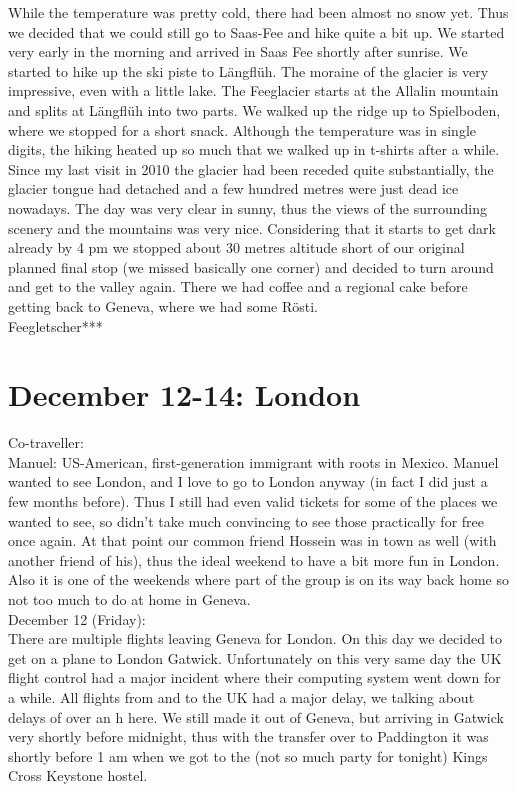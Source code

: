 While the temperature was pretty cold, there had been almost no snow yet. Thus we decided that we could still go to Saas-Fee and hike quite a bit up. We started very early in the morning and arrived in Saas Fee shortly after sunrise. We started to hike up the ski piste to L\"angfl\"uh. The moraine of the glacier is very impressive, even with a little lake. The Feeglacier starts at the Allalin mountain and splits at L\"angfl\"uh into two parts. We walked up the ridge up to Spielboden, where we stopped for a short snack. Although the temperature was in single digits, the hiking heated up so much that we walked up in t-shirts after a while. Since my last visit in 2010 the glacier had been receded quite substantially, the glacier tongue had detached and a few hundred metres were just dead ice nowadays. The day was very clear in sunny, thus the views of the surrounding scenery and the mountains was very nice. Considering that it starts to get dark already by 4 pm we stopped about 30 metres altitude short of our original planned final stop (we missed basically one corner) and decided to turn around and get to the valley again. There we had coffee and a regional cake before getting back to Geneva, where we had some R\"osti.\\

Feegletscher***\\

\section{December 12-14: London}
\label{London2014}

Co-traveller:\\
Manuel: US-American, first-generation immigrant with roots in Mexico. Manuel wanted to see London, and I love to go to London anyway (in fact I did just a few months before). Thus I still had even valid tickets for some of the places we wanted to see, so didn't take much convincing to see those practically for free once again. At that point our common friend Hossein was in town as well (with another friend of his), thus the ideal weekend to have a bit more fun in London. Also it is one of the weekends where part of the group is on its way back home so not too much to do at home in Geneva.\\

December 12 (Friday):\\
There are multiple flights leaving Geneva for London. On this day we decided to get on a plane to London Gatwick. Unfortunately on this very same day the UK flight control had a major incident where their computing system went down for a while. All flights from and to the UK had a major delay, we talking about delays of over an h here. We still made it out of Geneva, but arriving in Gatwick very shortly before midnight, thus with the transfer over to Paddington it was shortly before 1 am when we got to the (not so much party for tonight) Kings Cross Keystone hostel.\\

